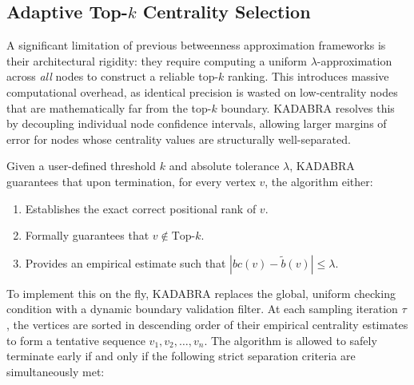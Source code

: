 \subsection{Adaptive Top-$k$ Centrality Selection}
A significant limitation of previous betweenness approximation frameworks is their architectural rigidity: they require computing a uniform $\lambda$-approximation across \textit{all} nodes to construct a reliable top-$k$ ranking. This introduces massive computational overhead, as identical precision is wasted on low-centrality nodes that are mathematically far from the top-$k$ boundary. KADABRA resolves this by decoupling individual node confidence intervals, allowing larger margins of error for nodes whose centrality values are structurally well-separated.

Given a user-defined threshold $k$ and absolute tolerance $\lambda$, KADABRA guarantees that upon termination, for every vertex $v$, the algorithm either:
\begin{enumerate}
    \item Establishes the exact correct positional rank of $v$.
    \item Formally guarantees that $v \notin \text{Top-}k$.
    \item Provides an empirical estimate such that $|bc(v) - \tilde{b}(v)| \le \lambda$.
\end{enumerate}

To implement this on the fly, KADABRA replaces the global, uniform checking condition with a dynamic boundary validation filter. At each sampling iteration $\tau$, the vertices are sorted in descending order of their empirical centrality estimates to form a tentative sequence $v_1, v_2, \dots, v_n$. The algorithm is allowed to safely terminate early if and only if the following strict separation criteria are simultaneously met:


